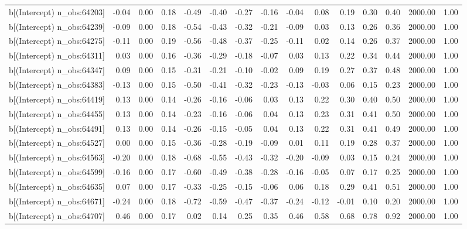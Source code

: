\begin{table}[ht]
\begin{tabular}{rrrrrrrrrrrrrrr}
  b[(Intercept) n\_obs:64203] & -0.04 & 0.00 & 0.18 & -0.49 & -0.40 & -0.27 & -0.16 & -0.04 & 0.08 & 0.19 & 0.30 & 0.40 & 2000.00 & 1.00 \\ 
  b[(Intercept) n\_obs:64239] & -0.09 & 0.00 & 0.18 & -0.54 & -0.43 & -0.32 & -0.21 & -0.09 & 0.03 & 0.13 & 0.26 & 0.36 & 2000.00 & 1.00 \\ 
  b[(Intercept) n\_obs:64275] & -0.11 & 0.00 & 0.19 & -0.56 & -0.48 & -0.37 & -0.25 & -0.11 & 0.02 & 0.14 & 0.26 & 0.37 & 2000.00 & 1.00 \\ 
  b[(Intercept) n\_obs:64311] & 0.03 & 0.00 & 0.16 & -0.36 & -0.29 & -0.18 & -0.07 & 0.03 & 0.13 & 0.22 & 0.34 & 0.44 & 2000.00 & 1.00 \\ 
  b[(Intercept) n\_obs:64347] & 0.09 & 0.00 & 0.15 & -0.31 & -0.21 & -0.10 & -0.02 & 0.09 & 0.19 & 0.27 & 0.37 & 0.48 & 2000.00 & 1.00 \\ 
  b[(Intercept) n\_obs:64383] & -0.13 & 0.00 & 0.15 & -0.50 & -0.41 & -0.32 & -0.23 & -0.13 & -0.03 & 0.06 & 0.15 & 0.23 & 2000.00 & 1.00 \\ 
  b[(Intercept) n\_obs:64419] & 0.13 & 0.00 & 0.14 & -0.26 & -0.16 & -0.06 & 0.03 & 0.13 & 0.22 & 0.30 & 0.40 & 0.50 & 2000.00 & 1.00 \\ 
  b[(Intercept) n\_obs:64455] & 0.13 & 0.00 & 0.14 & -0.23 & -0.16 & -0.06 & 0.04 & 0.13 & 0.23 & 0.31 & 0.41 & 0.50 & 2000.00 & 1.00 \\ 
  b[(Intercept) n\_obs:64491] & 0.13 & 0.00 & 0.14 & -0.26 & -0.15 & -0.05 & 0.04 & 0.13 & 0.22 & 0.31 & 0.41 & 0.49 & 2000.00 & 1.00 \\ 
  b[(Intercept) n\_obs:64527] & 0.00 & 0.00 & 0.15 & -0.36 & -0.28 & -0.19 & -0.09 & 0.01 & 0.11 & 0.19 & 0.28 & 0.37 & 2000.00 & 1.00 \\ 
  b[(Intercept) n\_obs:64563] & -0.20 & 0.00 & 0.18 & -0.68 & -0.55 & -0.43 & -0.32 & -0.20 & -0.09 & 0.03 & 0.15 & 0.24 & 2000.00 & 1.00 \\ 
  b[(Intercept) n\_obs:64599] & -0.16 & 0.00 & 0.17 & -0.60 & -0.49 & -0.38 & -0.28 & -0.16 & -0.05 & 0.07 & 0.17 & 0.25 & 2000.00 & 1.00 \\ 
  b[(Intercept) n\_obs:64635] & 0.07 & 0.00 & 0.17 & -0.33 & -0.25 & -0.15 & -0.06 & 0.06 & 0.18 & 0.29 & 0.41 & 0.51 & 2000.00 & 1.00 \\ 
  b[(Intercept) n\_obs:64671] & -0.24 & 0.00 & 0.18 & -0.72 & -0.59 & -0.47 & -0.37 & -0.24 & -0.12 & -0.01 & 0.10 & 0.20 & 2000.00 & 1.00 \\ 
  b[(Intercept) n\_obs:64707] & 0.46 & 0.00 & 0.17 & 0.02 & 0.14 & 0.25 & 0.35 & 0.46 & 0.58 & 0.68 & 0.78 & 0.92 & 2000.00 & 1.00 \\ 

\end{tabular}
\end{table}
